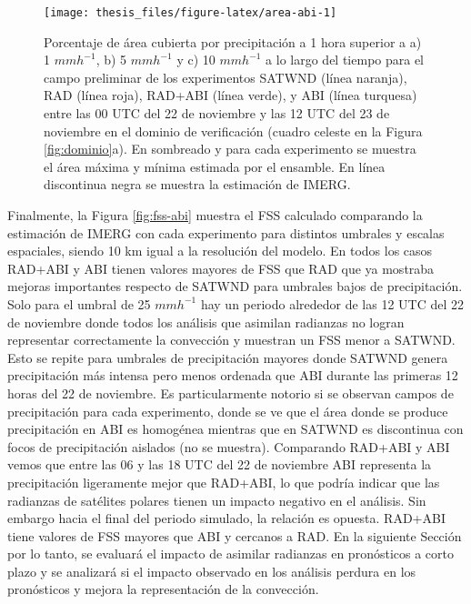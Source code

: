 \documentclass[12pt,oneside,a4paper]{reedthesis}
\begin{document}
\begin{figure}
\texttt{[image: thesis\_files/figure-latex/area-abi-1]} \caption{Porcentaje de área cubierta por precipitación a 1 hora superior a a) 1 \(mmh^{-1}\), b) 5 \(mmh^{-1}\) y c) 10 \(mmh^{-1}\) a lo largo del tiempo para el campo preliminar de los experimentos SATWND (línea naranja), RAD (línea roja), RAD+ABI (línea verde), y ABI (línea turquesa) entre las 00 UTC del 22 de noviembre y las 12 UTC del 23 de noviembre en el dominio de verificación (cuadro celeste en la Figura \ref{fig:dominio}a). En sombreado y para cada experimento se muestra el área máxima y mínima estimada por el ensamble. En línea discontinua negra se muestra la estimación de IMERG.}\label{fig:area-abi}
\end{figure}
Finalmente, la Figura \ref{fig:fss-abi} muestra el FSS calculado comparando la estimación de IMERG con cada experimento para distintos umbrales y escalas espaciales, siendo 10 km igual a la resolución del modelo. En todos los casos RAD+ABI y ABI tienen valores mayores de FSS que RAD que ya mostraba mejoras importantes respecto de SATWND para umbrales bajos de precipitación. Solo para el umbral de 25 \(mmh^{-1}\) hay un periodo alrededor de las 12 UTC del 22 de noviembre donde todos los análisis que asimilan radianzas no logran representar correctamente la convección y muestran un FSS menor a SATWND. Esto se repite para umbrales de precipitación mayores donde SATWND genera precipitación más intensa pero menos ordenada que ABI durante las primeras 12 horas del 22 de noviembre. Es particularmente notorio si se observan campos de precipitación para cada experimento, donde se ve que el área donde se produce precipitación en ABI es homogénea mientras que en SATWND es discontinua con focos de precipitación aislados (no se muestra). Comparando RAD+ABI y ABI vemos que entre las 06 y las 18 UTC del 22 de noviembre ABI representa la precipitación ligeramente mejor que RAD+ABI, lo que podría indicar que las radianzas de satélites polares tienen un impacto negativo en el análisis. Sin embargo hacia el final del periodo simulado, la relación es opuesta. RAD+ABI tiene valores de FSS mayores que ABI y cercanos a RAD. En la siguiente Sección por lo tanto, se evaluará el impacto de asimilar radianzas en pronósticos a corto plazo y se analizará si el impacto observado en los análisis perdura en los pronósticos y mejora la representación de la convección.
\end{document}
